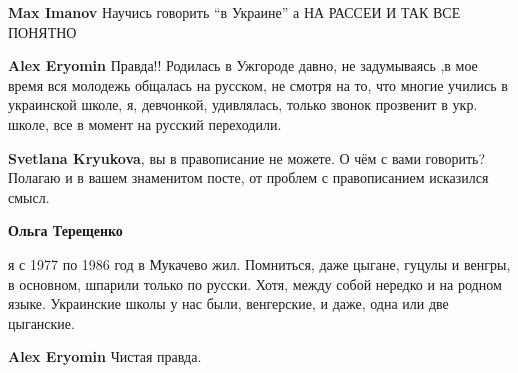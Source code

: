 \begin{itemize}
\begin{itemize}
 
\textbf{Max Imanov} Научись говорить \enquote{в Украине} а НА РАССЕИ И ТАК ВСЕ ПОНЯТНО

 
\textbf{Alex Eryomin} Правда!!
Родилась в Ужгороде давно, не задумываясь ,в мое время вся молодежь общалась на русском, не смотря на то, что многие учились в украинской школе, я, девчонкой, удивлялась, только звонок прозвенит в укр. школе, все в момент на русский переходили.

 
\textbf{Svetlana Kryukova}, вы в правописание не можете. О чём с вами говорить? Полагаю и в вашем знаменитом посте, от проблем с правописанием исказился смысл.

 
\textbf{Ольга Терещенко} 

я с 1977 по 1986 год в Мукачево жил. Помниться, даже цыгане, гуцулы и венгры, в
основном, шпарили только по русски. Хотя, между собой нередко и на родном
языке. Украинские школы у нас были, венгерские, и даже, одна или две цыганские.

 
\textbf{Alex Eryomin} Чистая правда.

 

\end{itemize}
\end{itemize}
